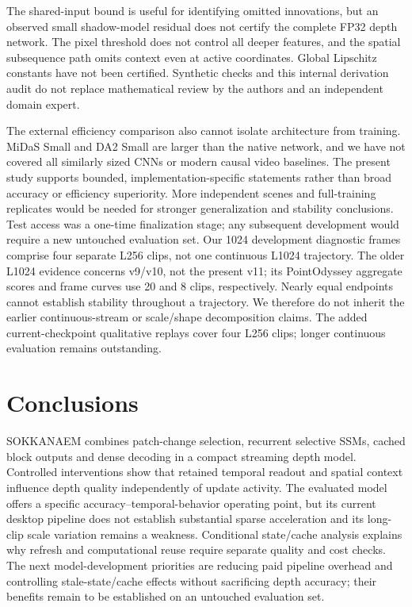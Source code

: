 \documentclass[mathematics,article,submit,moreauthors]{Definitions/mdpi}
\begin{document}
The shared-input bound is useful for identifying omitted innovations, but an observed
small shadow-model residual does not certify the complete FP32 depth network. The
pixel threshold does not control all deeper features, and the spatial subsequence path
omits context even at active coordinates. Global Lipschitz constants have not been
certified. Synthetic checks and this internal derivation audit do not replace mathematical
review by the authors and an independent domain expert.

The external efficiency comparison also cannot isolate architecture from training.
MiDaS Small and DA2 Small are larger than the native network, and we have not covered
all similarly sized CNNs or modern causal video baselines. The present study supports
bounded, implementation-specific statements rather than broad accuracy or efficiency
superiority. More independent scenes and full-training replicates would be needed for
stronger generalization and stability conclusions. Test access was a one-time finalization
stage; any subsequent development would require a new untouched evaluation set.
Our 1024 development diagnostic frames comprise four separate L256 clips, not
one continuous L1024 trajectory. The older L1024 evidence concerns v9/v10,
not the present v11; its PointOdyssey aggregate scores and frame curves use
20 and 8 clips, respectively. Nearly equal endpoints cannot establish stability
throughout a trajectory. We therefore do not inherit the earlier continuous-stream
or scale/shape decomposition claims. The added current-checkpoint qualitative
replays cover four L256 clips; longer continuous evaluation remains outstanding.

\section{Conclusions}
SOKKANAEM combines patch-change selection, recurrent selective SSMs, cached block
outputs and dense decoding in a compact streaming depth model. Controlled
interventions show that retained temporal readout and spatial context influence
depth quality independently of update activity. The evaluated model offers a
specific accuracy--temporal-behavior operating point, but its current desktop
pipeline does not establish substantial sparse acceleration and its long-clip
scale variation remains a weakness. Conditional state/cache analysis explains
why refresh and computational reuse require separate quality and cost checks.
The next model-development priorities are reducing paid pipeline overhead and
controlling stale-state/cache effects without sacrificing depth accuracy; their
benefits remain to be established on an untouched evaluation set.
\end{document}

